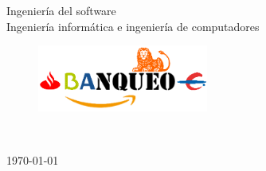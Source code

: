 \date{\today}


\begin{titlepage}


    \makeatletter
    \centering
    \vspace*{6\baselineskip}



    {\huge \underbar{\nombredelproyecto}\par} %


    Ingeniería del software\\
    Ingeniería informática e ingeniería de computadores

    \vspace*{3\baselineskip} %


    \begin{figure}[H]
        \centering
        \includegraphics[width=0.5\textwidth]{images/Banqueo.png}
    \end{figure}


    \vspace{0.75\baselineskip} %
    \begin{flushright}
        \small\@author\\ %
    \end{flushright}


    \vspace{0.5\baselineskip} %


    \vfill %

    \vspace{0.3\baselineskip} %

    \today %
    \makeatother
\end{titlepage}

